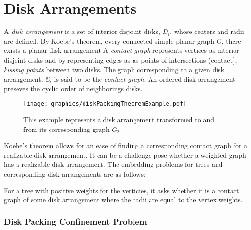 \section{Disk Arrangements}


A \textit{disk arrangement} is a set of interior disjoint disks, $D_i$, whose centers and radii are defined.  
By Koebe's theorem, every connected simple planar graph $G$, there exists a planar disk arrangement 
A \textit{contact graph} represents vertices as interior disjoint disks and by representing edges as as points of intersections (contact), \textit{kissing points} between two disks.  
The graph corresponding to a given disk arrangement, $\DD$, is said to be the \textit{contact graph}. 
An ordered disk arrangement preseves the  cyclic order of neighborings disks. 
\begin{figure}[h]
\begin{center}
\texttt{[image: graphics/diskPackingTheoremExample.pdf]}
\end{center} 
\caption{This example represents a disk arrangement transformed to and from its corresponding graph 
$G_2$}
\label{fig:DiskArrangement-1}
\end{figure}

Koebe's theorem allows for an ease of finding a corresponding contact graph for a realizable disk arrangement.  
It can be a challenge pose whether a weighted graph has a realizable disk arrangement.
The embedding problems for trees and corresponding disk arrangements are as follows:
\begin{prob}\label{problem:UnorderedTree}
For a tree with positive weights for the verticies, it asks whether it is a contact graph of some 
disk arrangement where the radii are equal to the vertex weights.
\end{prob}

\subsubsection{Disk Packing Confinement Problem}

